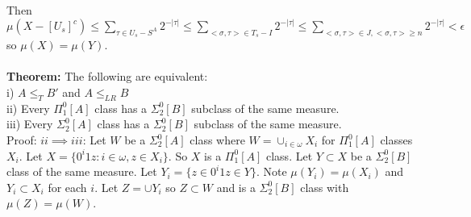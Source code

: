 \documentclass{article}
\begin{document}
      Then $\mu(X - [U_s]^c) \leq \sum_{\tau \in U_s - S^A} 2^{-|\tau|}\leq \sum_{<\sigma,\tau> \in T_s - I} 2^{-|\tau|} \leq  \sum_{<\sigma,\tau> \in J, <\sigma,\tau>\geq n} 2^{-|\tau|} < \epsilon $ so $\mu(X) = \mu(Y)$.\\\\
      \textbf{Theorem:} The following are equivalent: \\      
      i) $A \leq_T B'$ and $A \leq_{LR} B$\\
      ii) Every $\Pi^0_1[A]$ class has a $\Sigma_2^0[B]$ subclass of the same measure.\\
      iii) Every $\Sigma^0_2[A]$ class has a $\Sigma^0_2[B]$ subclass of the same measure. 
      \\ Proof: $ii \implies iii$: Let $W$ be a $\Sigma^0_2[A]$ class where $W = \cup_{i \in \omega} X_i$ for $\Pi^0_1[A]$ classes $X_i$. Let $X = \{0^i1z: i \in \omega, z \in X_i\}$. So $X$ is a $\Pi^0_1[A]$ class. Let $Y\subset X$ be a $\Sigma^0_2[B]$ class of the same measure. Let $Y_i = \{z \in 0^i1z \in Y\}$. Note $\mu(Y_i) = \mu(X_i)$ and $Y_i \subset X_i$ for each $i$. Let $Z = \cup Y_i$ so $Z \subset W$ and is a $\Sigma^0_2[B]$ class with $\mu(Z) = \mu(W)$.
      \newpage
\end{document}
